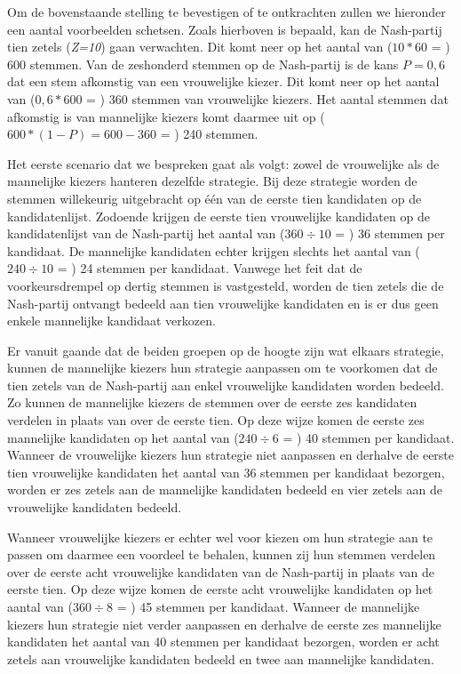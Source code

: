 Om de bovenstaande stelling te bevestigen of te ontkrachten zullen we hieronder een aantal voorbeelden schetsen. Zoals hierboven is bepaald, kan de Nash-partij tien zetels (\textit{Z=10}) gaan verwachten. Dit komt neer op het aantal van ($10*60$ = ) 600 stemmen. Van de zeshonderd stemmen op de Nash-partij is de kans $P=0,6$ dat een stem afkomstig van een vrouwelijke kiezer. Dit komt neer op het aantal van ($0,6*600$ = ) 360 stemmen van vrouwelijke kiezers. Het aantal stemmen dat afkomstig is van mannelijke kiezers komt daarmee uit op ($600*(1-P)=600-360$ = ) 240 stemmen.

Het eerste scenario dat we bespreken gaat als volgt: zowel de vrouwelijke als de mannelijke kiezers hanteren dezelfde strategie. Bij deze strategie worden de stemmen willekeurig uitgebracht op één van de eerste tien kandidaten op de kandidatenlijst. Zodoende krijgen de eerste tien vrouwelijke kandidaten op de kandidatenlijst van de Nash-partij het aantal van ($360\div10$ = ) 36 stemmen per kandidaat. De mannelijke kandidaten echter krijgen slechts het aantal van ($240\div10$ = ) 24 stemmen per kandidaat. Vanwege het feit dat de voorkeursdrempel op dertig stemmen is vastgesteld, worden de tien zetels die de Nash-partij ontvangt bedeeld aan tien vrouwelijke kandidaten en is er dus geen enkele mannelijke kandidaat verkozen.

Er vanuit gaande dat de beiden groepen op de hoogte zijn wat elkaars strategie, kunnen de mannelijke kiezers hun strategie aanpassen om te voorkomen dat de tien zetels van de Nash-partij aan enkel vrouwelijke kandidaten worden bedeeld. Zo kunnen de mannelijke kiezers de stemmen over de eerste zes kandidaten verdelen in plaats van over de eerste tien. Op deze wijze komen de eerste zes mannelijke kandidaten op het aantal van ($240\div6$ = ) 40 stemmen per kandidaat. Wanneer de vrouwelijke kiezers hun strategie niet aanpassen en derhalve de eerste tien vrouwelijke kandidaten het aantal van 36 stemmen per kandidaat bezorgen, worden er zes zetels aan de mannelijke kandidaten bedeeld en vier zetels aan de vrouwelijke kandidaten bedeeld. 

Wanneer vrouwelijke kiezers er echter wel voor kiezen om hun strategie aan te passen om daarmee een voordeel te behalen, kunnen zij hun stemmen verdelen over de eerste acht vrouwelijke kandidaten van de Nash-partij in plaats van de eerste tien. Op deze wijze komen de eerste acht vrouwelijke kandidaten op het aantal van ($360\div8$ = ) 45 stemmen per kandidaat. Wanneer de mannelijke kiezers hun strategie niet verder aanpassen en derhalve de eerste zes mannelijke kandidaten het aantal van 40 stemmen per kandidaat bezorgen, worden er acht zetels aan vrouwelijke kandidaten bedeeld en twee aan mannelijke kandidaten. 

